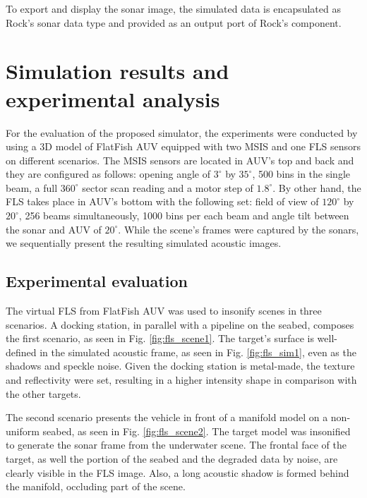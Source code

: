 \documentclass[final,5p,times]{elsarticle}
\begin{document}
To export and display the sonar image, the simulated data is encapsulated as Rock's sonar data type and provided as an output port of Rock's component.


\section{Simulation results and experimental analysis}
\label{results}

For the evaluation of the proposed simulator, the experiments were conducted by using a 3D model of FlatFish AUV equipped with two MSIS and one FLS sensors on different scenarios. The MSIS sensors are located in AUV's top and back and they are configured as follows: opening angle of $3^{\circ}$ by $35^{\circ}$, 500 bins in the single beam, a full $360^{\circ}$ sector scan reading and a motor step of $1.8^{\circ}$. By other hand, the FLS takes place in AUV's bottom with the following set: field of view of $120^{\circ}$ by $20^{\circ}$, 256 beams simultaneously, 1000 bins per each beam and angle tilt between the sonar and AUV of $20^{\circ}$. While the scene's frames were captured by the sonars, we sequentially present the resulting simulated acoustic images.

\subsection{Experimental evaluation}

The virtual FLS from FlatFish AUV was used to insonify scenes in three scenarios. A docking station, in parallel with a pipeline on the seabed, composes the first scenario, as seen in Fig. \ref{fig:fls_scene1}. The target's surface is well-defined in the simulated acoustic frame, as seen in Fig. \ref{fig:fls_sim1}, even as the shadows and speckle noise. Given the docking station is metal-made, the texture and reflectivity were set, resulting in a higher intensity shape in comparison with the other targets.

The second scenario presents the vehicle in front of a manifold model on a non-uniform seabed, as seen in Fig. \ref{fig:fls_scene2}. The target model was insonified to generate the sonar frame from the underwater scene. The frontal face of the target, as well the portion of the seabed and the degraded data by noise, are clearly visible in the FLS image. Also, a long acoustic shadow is formed behind the manifold, occluding part of the scene.
\end{document}
